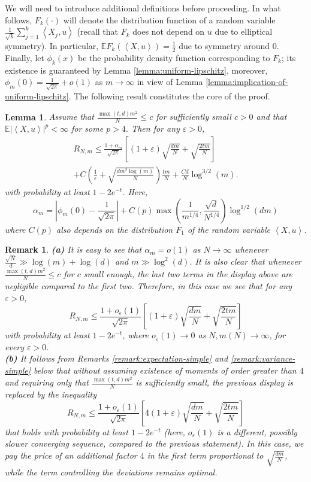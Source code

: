 \documentclass[12pt]{article}
\newcommand{\eps}{\varepsilon}
\def\l{\left}
\def\r{\right}
\newcommand{\mb}{\mathbb}
\newcommand{\dotp}[2]{\left\langle#1,#2\right\rangle}
\newtheorem{lemma}{Lemma}
\theoremstyle{thmstyletwo}%
\newtheorem{remark}{Remark}%
\theoremstyle{thmstylethree}%
\begin{document}
We will need to introduce additional definitions before proceeding. 
In what follows, $F_k(\cdot)$ will denote the distribution function of a random variable $\frac{1}{\sqrt{k}}\sum_{j=1}^k \dotp{X_j}{u}$ (recall that $F_k$ does not depend on $u$ due to elliptical symmetry). In particular, $\mb E F_{k}\l( \dotp{X}{u}\r)=\frac12$ due to symmetry around $0$. 
Finally, let $\phi_k(x)$ be the probability density function corresponding to $F_k$; its existence is guaranteed by Lemma \ref{lemma:uniform-lipschitz}, moreover, $\phi_m(0)=\frac{1}{\sqrt{2\pi}}+o(1)$ as $m\to\infty$ in view of Lemma \ref{lemma:implication-of-uniform-lipschitz}. The following result constitutes the core of the proof. 
\begin{lemma}
\label{lemma:halfspace}
Assume that $\frac{\max(t,d)m^2}{N}\leq c$ for sufficiently small $c>0$ and that $\mb E\l|\dotp{X}{u}\r|^p<\infty$ for some $p>4$. Then for any $\eps>0$, 
\begin{multline*}  
R_{N,m}\leq \frac{ 1 + \alpha_m}{\sqrt{2\pi}}\l[(1+\eps)\sqrt{\frac{dm}{N}} +
\sqrt{\frac{2tm}{N}} \r]
\\
+C\l(\frac{1}{\eps}+\sqrt{\frac{dm^2\log(m)}{N}}\r)\frac{tm}{N}
    +\frac{Cd}{N}\log^{3/2}(m).
\end{multline*}
with probability at least $1-2e^{-t}$.
Here, 
\[
\alpha_m = \l| \phi_m(0) - \frac{1}{\sqrt{2\pi}}\r| + C(p)\max\l(\frac{1}{m^{1/4}},\frac{\sqrt{d}}{N^{1/4}}\r)\log^{1/2}(dm)
\]
where $C(p)$ also depends on the distribution $F_1$ of the random variable $\dotp{X}{u}$. 
\end{lemma}
\begin{remark}
    \textbf{(a)} It is easy to see that $\alpha_m = o(1)$ as $N\to\infty$ whenever $\frac{\sqrt N}{d}\gg \log(m)+\log(d)$ and $m\gg \log^2(d)$. It is also clear that whenever $\frac{\max(t,d) m^2}{N}\leq c$ for $c$ small enough, the last two terms in the display above are negligible compared to the first two. Therefore, in this case we see that for any $\eps>0$, 
    \[
    R_{N,m}\leq \frac{ 1 + o_\eps(1)}{\sqrt{2\pi}}\l[(1+\eps)\sqrt{\frac{dm}{N}} +
    \sqrt{\frac{2tm}{N}} \r]
    \]
    with probability at least $1-2e^{-t}$, where $o_\eps(1)\to 0$ as $N,m(N)\to\infty$, for every $\eps>0$. \\
    \noindent \textbf{(b)} It follows from Remarks \ref{remark:expectation-simple} and \ref{remark:variance-simple} below that without assuming existence of moments of order greater than $4$ and requiring only that $\frac{\max(t,d)m^2}{N}$ is sufficiently small, the previous display is replaced by the inequality
    \[ 
    R_{N,m}\leq \frac{1 + o_\eps(1)}{\sqrt{2\pi}}\l[4(1+\eps)\sqrt{\frac{dm}{N}} +
    \sqrt{\frac{2tm}{N}} \r]
    \]
that holds with probability at least $1-2e^{-t}$ (here, $o_\eps(1)$ is a different, possibly slower converging sequence, compared to the previous statement). In this case, we pay the price of an additional factor $4$ in the first term proportional to $\sqrt{\frac{dm}{N}}$, while the term controlling the deviations remains optimal. 
\end{remark}
\end{document}
